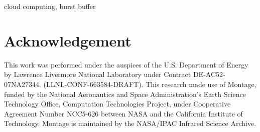 \documentclass[10pt, conference, compsocconf]{IEEEtran}
\begin{document}
\begin{IEEEkeywords}
	cloud computing, burst buffer
\end{IEEEkeywords}

\IEEEpeerreviewmaketitle

















\section*{Acknowledgement}
This work was performed under the auspices of the U.S. Department of Energy by
Lawrence Livermore National Laboratory under Contract DE-AC52-07NA27344.
(LLNL-CONF-663584-DRAFT).
This research made use of Montage, funded by the National Aeronautics and Space Administration's
Earth Science Technology Office, Computation Technologies Project, under
Cooperative Agreement Number NCC5-626 between NASA and the California Institute
of Technology. Montage is maintained by the NASA/IPAC Infrared Science Archive.

\end{document}
